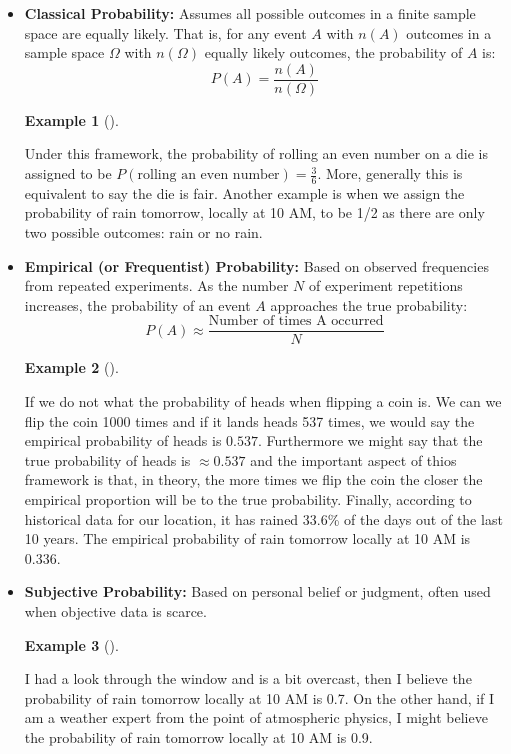 \documentclass[
  letterpaper,
  DIV=11,
  numbers=noendperiod]{scrreport}
\theoremstyle{definition}
\newtheorem{example}{Example}[chapter]
\theoremstyle{plain}
\theoremstyle{plain}
\theoremstyle{definition}
\theoremstyle{remark}
\begin{document}
\begin{itemize}
\item
  \textbf{Classical Probability:} Assumes all possible outcomes in a
  finite sample space are equally likely. That is, for any event \(A\)
  with \(n(A)\) outcomes in a sample space \(\Omega\) with \(n(\Omega)\)
  equally likely outcomes, the probability of \(A\) is:
  \[ P(A) = \frac{n(A)}{n(\Omega)} \]

  \begin{example}[]\protect\hypertarget{exm-classical-prob}{}\label{exm-classical-prob}

  Under this framework, the probability of rolling an even number on a
  die is assigned to be
  \(P(\text{rolling an even number}) = \frac{3}{6}\). More, generally
  this is equivalent to say the die is fair. Another example is when we
  assign the probability of rain tomorrow, locally at 10 AM, to be 1/2
  as there are only two possible outcomes: rain or no rain.

  \end{example}
\item
  \textbf{Empirical (or Frequentist) Probability:} Based on observed
  frequencies from repeated experiments. As the number \(N\) of
  experiment repetitions increases, the probability of an event \(A\)
  approaches the true probability:
  \[ P(A) \approx \frac{\text{Number of times A occurred}}{N} \]

  \begin{example}[]\protect\hypertarget{exm-frequentist-prob}{}\label{exm-frequentist-prob}

  If we do not what the probability of heads when flipping a coin is. We
  can we flip the coin 1000 times and if it lands heads 537 times, we
  would say the empirical probability of heads is \(0.537\). Furthermore
  we might say that the true probability of heads is \(\approx 0.537\)
  and the important aspect of thios framework is that, in theory, the
  more times we flip the coin the closer the empirical proportion will
  be to the true probability. Finally, according to historical data for
  our location, it has rained 33.6\% of the days out of the last 10
  years. The empirical probability of rain tomorrow locally at 10 AM is
  0.336.

  \end{example}
\item
  \textbf{Subjective Probability:} Based on personal belief or judgment,
  often used when objective data is scarce.

  \begin{example}[]\protect\hypertarget{exm-subjective-prob}{}\label{exm-subjective-prob}

  I had a look through the window and is a bit overcast, then I believe
  the probability of rain tomorrow locally at 10 AM is 0.7. On the other
  hand, if I am a weather expert from the point of atmospheric physics,
  I might believe the probability of rain tomorrow locally at 10 AM is
  0.9.

  \end{example}
\end{itemize}
\end{document}
